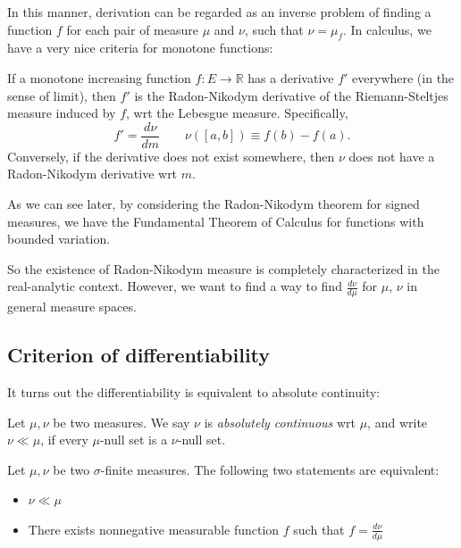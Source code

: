 In this manner, derivation can be regarded as an inverse problem of finding a function $f$ for each pair of measure $\mu$ and $\nu$, such that $\nu = \mu_f$. In calculus, we have a very nice criteria for monotone functions:


\begin{theorem}
	If a monotone increasing function $f: E \to \mathbb{R}$ has a derivative $f'$ everywhere (in the sense of limit), then $f'$ is the Radon-Nikodym derivative of the Riemann-Steltjes measure induced by  $f$, wrt the Lebesgue measure. Specifically,
	\[
		f' = \frac{d \nu}{dm} \qquad \nu([a,b])\equiv f(b) - f(a)
	.\] 
	Conversely, if the derivative does not exist somewhere, then $\nu$ does not have a Radon-Nikodym derivative wrt $m$.
\end{theorem}
\begin{remark}
	As we can see later, by considering the Radon-Nikodym theorem for signed measures, we have the Fundamental Theorem of Calculus for functions with bounded variation.
\end{remark}

So the existence of Radon-Nikodym measure is completely characterized in the real-analytic context. However, we want to find a way to find $\frac{d\nu}{d\mu}$ for $\mu$, $\nu$ in general measure spaces. 

\subsection{Criterion of differentiability}

It turns out the differentiability is equivalent to absolute continuity:

\begin{definition}
	Let $\mu, \nu$ be two measures. We say $\nu$ is \textit{absolutely continuous} wrt $\mu$, and write $\nu \ll \mu$, if every $\mu$-null set is a $\nu$-null set.
\end{definition}

\begin{theorem}
	Let $\mu, \nu$ be two $\sigma$-finite measures.
	The following two statements are equivalent:
	\begin{itemize}
		\item $\nu \ll \mu$
		\item There exists nonnegative measurable function $f$ such that $f = \frac{d \nu}{d \mu}$
	\end{itemize}
\end{theorem}

